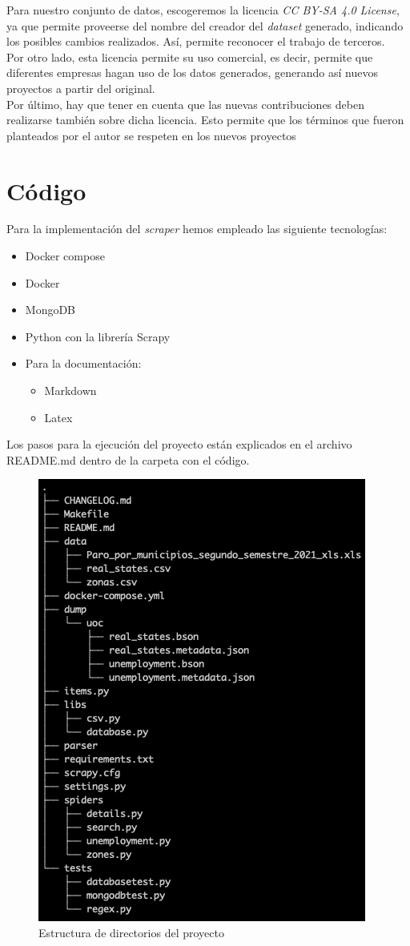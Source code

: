 \documentclass[a4paper, 12pt]{article}
\begin{document}
Para nuestro conjunto de datos, escogeremos la licencia {\itshape CC BY-SA 4.0 License}, ya que permite proveerse del nombre del creador del {\itshape dataset} generado, indicando los posibles cambios realizados. Así, permite reconocer el trabajo de terceros.\\
Por otro lado, esta licencia permite su uso comercial, es decir, permite que diferentes empresas hagan uso de los datos generados, generando así nuevos proyectos a partir del original.\\
Por último, hay que tener en cuenta que las nuevas contribuciones deben realizarse también sobre dicha licencia. Esto permite que los términos que fueron planteados por el autor se respeten en los nuevos proyectos

\section{Código}

Para la implementación del {\itshape scraper} hemos empleado las siguiente tecnologías:
\begin{itemize}
\item Docker compose
\item Docker
\item MongoDB
\item Python con la librería Scrapy
\item Para la documentación:
	\begin{itemize}
		\item Markdown
		\item Latex
	\end{itemize}
\end{itemize}

Los pasos para la ejecución del proyecto están explicados en el archivo README.md dentro de la carpeta con el código.

\begin{figure}[H]
	\centering
	\includegraphics[width=0.7\linewidth]{img/screenshot025}
	\caption{Estructura de directorios del proyecto}
	\label{fig:screenshot025}
\end{figure}
\end{document}
